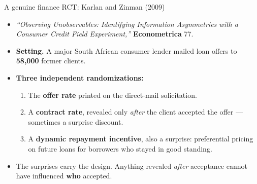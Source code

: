 \documentclass[
  11pt,
  ignorenonframetext,
  aspectratio=169,
]{beamer}
\providecommand{\tightlist}{%
  \setlength{\itemsep}{0pt}\setlength{\parskip}{0pt}}
\begin{document}
\begin{frame}{A genuine finance RCT: Karlan and Zinman (2009)}
\protect{}\label{a-genuine-finance-rct-karlan-and-zinman-2009}
\begin{itemize}
\tightlist
\item
  \emph{``Observing Unobservables: Identifying Information Asymmetries
  with a Consumer Credit Field Experiment,''} \textbf{Econometrica} 77.
\item
  \textbf{Setting.} A major South African consumer lender mailed loan
  offers to \textbf{58,000} former clients.
\item
  \textbf{Three independent randomizations:}

  \begin{enumerate}
  \tightlist
  \item
    The \textbf{offer rate} printed on the direct-mail solicitation.
  \item
    A \textbf{contract rate}, revealed only \emph{after} the client
    accepted the offer --- sometimes a surprise discount.
  \item
    A \textbf{dynamic repayment incentive}, also a surprise:
    preferential pricing on future loans for borrowers who stayed in
    good standing.
  \end{enumerate}
\item
  The surprises carry the design. Anything revealed \emph{after}
  acceptance cannot have influenced \textbf{who} accepted.
\end{itemize}
\end{frame}
\end{document}
